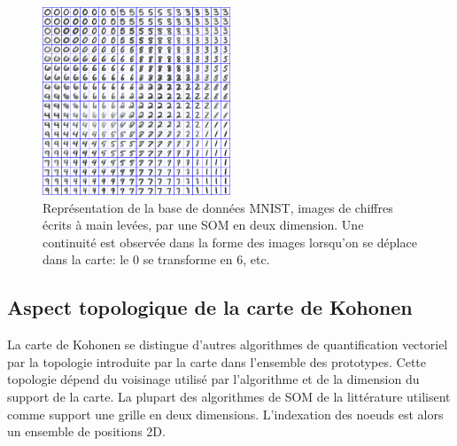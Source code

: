 \documentclass[../main]{subfiles}
\begin{document}



\begin{figure}
\centering
\includegraphics[width=0.5\textwidth]{digits.jpg}
\caption{Représentation de la base de données MNIST, images de chiffres écrits à main levées, par une SOM en deux dimension. Une continuité est observée dans la forme des images lorsqu'on se déplace dans la carte: le $0$ se transforme en $6$, etc.}
\label{fig:SOM}
\end{figure}



\subsection{Aspect topologique de la carte de Kohonen}

La carte de Kohonen se distingue d'autres algorithmes de quantification vectoriel par la topologie introduite par la carte dans l'ensemble des prototypes. Cette topologie dépend du voisinage utilisé par l'algorithme et de la dimension du support de la carte.
La plupart des algorithmes de SOM de la littérature utilisent comme support une grille en deux dimensions. L'indexation des noeuds est alors un ensemble de positions 2D.
\end{document}

